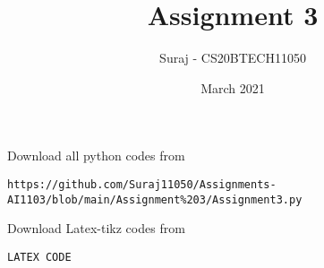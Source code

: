 \documentclass[journal,12pt,twocolumn]{IEEEtran}
\date{March 2021}
\DeclareMathOperator*{\Res}{Res}
\begin{document}
\newcommand{\BEQA}{\begin{eqnarray}}
\newcommand{\EEQA}{\end{eqnarray}}
\newcommand{\define}{\stackrel{\triangle}{=}}

\raggedbottom
\setlength{\parindent}{0pt}
\providecommand{\mbf}{\mathbf}
\providecommand{\pr}[1]{\ensuremath{\Pr\left(#1\right)}}
\providecommand{\qfunc}[1]{\ensuremath{Q\left(#1\right)}}
\providecommand{\fn}[1]{\ensuremath{f\left(#1\right)}}
\providecommand{\e}[1]{\ensuremath{E\left(#1\right)}}
\providecommand{\sbrak}[1]{\ensuremath{{}\left[#1\right]}}
\providecommand{\lsbrak}[1]{\ensuremath{{}\left[#1\right.}}
\providecommand{\rsbrak}[1]{\ensuremath{{}\left.#1\right]}}
\providecommand{\brak}[1]{\ensuremath{\left(#1\right)}}
\providecommand{\lbrak}[1]{\ensuremath{\left(#1\right.}}
\providecommand{\rbrak}[1]{\ensuremath{\left.#1\right)}}
\providecommand{\cbrak}[1]{\ensuremath{\left\{#1\right\}}}
\providecommand{\lcbrak}[1]{\ensuremath{\left\{#1\right.}}
\providecommand{\rcbrak}[1]{\ensuremath{\left.#1\right\}}}
\theoremstyle{remark}
\newtheorem{rem}{Remark}
\newcommand{\sgn}{\mathop{\mathrm{sgn}}}
\providecommand{\abs}[1]{\vert#1\vert}
\providecommand{\res}[1]{\Res\displaylimits_{#1}} 
\providecommand{\norm}[1]{\lVert#1\rVert}
\providecommand{\mtx}[1]{\mathbf{#1}}
\providecommand{\mean}[1]{E[ #1 ]}
\providecommand{\fourier}{\overset{\mathcal{F}}{ \rightleftharpoons}}
\providecommand{\system}{\overset{\mathcal{H}}{ \longleftrightarrow}}
\newcommand{\solution}{\noindent \textbf{Solution: }}
\newcommand{\cosec}{\,\text{cosec}\,}
\newcommand{\comp}{\mathsf{c}}
\providecommand{\dec}[2]{\ensuremath{\overset{#1}{\underset{#2}{\gtrless}}}}
\newcommand{\myvec}[1]{\ensuremath{\begin{pmatrix}#1\end{pmatrix}}}
\newcommand{\mydet}[1]{\ensuremath{\begin{vmatrix}#1\end{vmatrix}}}
\makeatletter
\vspace{3cm}
\title{Assignment 3}
\author{Suraj - CS20BTECH11050}
\maketitle
\newpage
\bigskip
\renewcommand{\thetable}{\theenumi}
Download all python codes from 
\begin{lstlisting}
https://github.com/Suraj11050/Assignments-AI1103/blob/main/Assignment%203/Assignment3.py
\end{lstlisting}
%
Download Latex-tikz codes from 
%
\begin{lstlisting}
LATEX CODE
\end{lstlisting}
\end{document}
